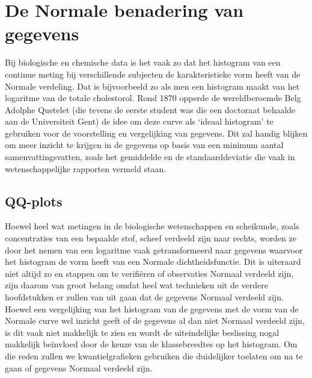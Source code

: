 \documentclass[
  12pt,dutch]{book}
\theoremstyle{definition}
\theoremstyle{definition}
\theoremstyle{definition}
\theoremstyle{definition}
\theoremstyle{remark}
\begin{document}
\section{De Normale benadering van gegevens}\label{sec:normal}

Bij biologische en chemische data is het vaak zo dat het histogram van een continue
meting bij verschillende subjecten de karakteristieke vorm heeft van de
Normale verdeling. Dat is bijvoorbeeld zo als men een histogram maakt van het
logaritme van de totale cholestorol. Rond 1870 opperde de wereldberoemde
Belg Adolphe Quetelet (die tevens de eerste student was die een doctoraat behaalde aan de Universiteit
Gent) de idee om deze curve als `ideaal histogram' te gebruiken voor de
voorstelling en vergelijking van gegevens. Dit zal handig blijken om meer
inzicht te krijgen in de gegevens op basis van een minimum aantal
samenvattingsvatten, zoals het gemiddelde en de standaarddeviatie die vaak
in wetenschappelijke rapporten vermeld staan.

\subsection{QQ-plots}\label{sec:qq}

Hoewel heel wat metingen in de biologische wetenschappen en scheikunde, zoals
concentraties van een bepaalde stof, scheef verdeeld zijn naar rechts,
worden ze door het nemen van een logaritme vaak getransformeerd naar
gegevens waarvoor het histogram de vorm heeft van een Normale dichtheidsfunctie.
Dit is uiteraard niet altijd zo en stappen om te verifiëren of observaties
Normaal verdeeld zijn, zijn daarom van groot belang omdat heel wat technieken uit de verdere hoofdstukken er zullen van uit gaan dat de
gegevens Normaal verdeeld zijn. Hoewel een vergelijking van het histogram
van de gegevens met de vorm van de Normale curve wel inzicht geeft of de
gegevens al dan niet Normaal verdeeld zijn, is dit vaak niet makkelijk te
zien en wordt de uiteindelijke beslissing nogal makkelijk beïnvloed door de keuze
van de klassebreedtes op het histogram. Om die reden zullen we
kwantielgrafieken gebruiken die duidelijker toelaten om na te gaan of
gegevens Normaal verdeeld zijn.
\end{document}

